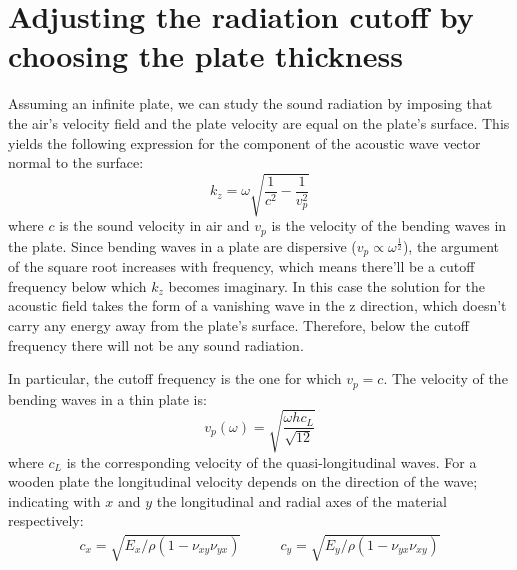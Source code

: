 \documentclass[a4paper]{article}
\begin{document}
\section{Adjusting the radiation cutoff by choosing the plate thickness}

Assuming an infinite plate, we can study the sound radiation by imposing that the air's velocity field and the plate velocity are equal on the plate's surface. This yields the following expression for the component of the acoustic wave vector normal to the surface:
$$ k_z = \omega \sqrt{\frac{1}{c^2} - \frac{1}{v_p^2}} $$
where $c$ is the sound velocity in air and $v_p$ is the velocity of the bending waves in the plate. Since bending waves in a plate are dispersive ($v_p \propto \omega^{\frac{1}{2}}$), the argument of the square root increases with frequency, which means there'll be a cutoff frequency below which $k_z$ becomes imaginary. In this case the solution for the acoustic field takes the form of a vanishing wave in the z direction, which doesn't carry any energy away from the plate's surface. Therefore, below the cutoff frequency there will not be any sound radiation.

In particular, the cutoff frequency is the one for which $v_p = c$. The velocity of the bending waves in a thin plate is:
$$ v_p(\omega) = \sqrt{\frac{\omega hc_L}{\sqrt{12}}} $$
where $c_L$ is the corresponding velocity of the quasi-longitudinal waves. For a wooden plate the longitudinal velocity depends on the direction of the wave; indicating with $x$ and $y$ the longitudinal and radial axes of the material respectively: 
\begin{align*}
	c_x = \sqrt{E_x /\rho(1 - \nu_{xy}\nu_{yx})} \qquad& c_y = \sqrt{E_y /\rho(1 - \nu_{yx}\nu_{xy})}
\end{align*}
\end{document}
